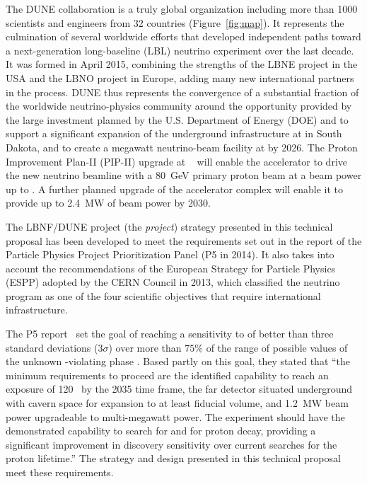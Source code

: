 The DUNE collaboration is a truly global organization including more than \num{1000} scientists and engineers from \num{32} countries (Figure~\ref{fig:map}). It represents the culmination of several worldwide efforts that developed independent paths toward a next-generation long-baseline (LBL) neutrino experiment over the last decade. It was formed in April 2015, combining the strengths of the LBNE project in the USA and the LBNO project in Europe, adding many new international partners in the process. DUNE thus represents the convergence of a substantial fraction of the worldwide neutrino-physics community around the opportunity provided by the large investment planned by the U.S. Department of Energy (DOE) and \fnal to support a significant expansion of the underground infrastructure at \surf in South Dakota, and to create a megawatt neutrino-beam facility at \fnal by 2026. The Proton Improvement Plan-II (PIP-II) upgrade at \fnal~\cite{pip2-2013} will enable the accelerator to drive the new neutrino beamline with a \SI{80}{\GeV} primary proton beam at a beam power %
up to \pipiibeampower{}. A further planned upgrade 
of the accelerator complex will enable it to provide up to \SI{2.4}{\MW} of beam power by 2030. 

The LBNF/DUNE project (the \textit{project}) strategy presented in this technical proposal has been developed to meet the requirements set out in the report of the Particle Physics Project Prioritization Panel (P5 in 2014). It also takes into account the recommendations of the European Strategy for Particle  Physics (ESPP) adopted by the CERN Council in 2013, which classified the  neutrino program as one of the four scientific objectives that require international infrastructure.

The P5 report~\cite{p5report} set the goal of reaching a sensitivity to  of better than three standard deviations (\num{3}$\sigma$) over more than $75\%$ 
of the range of possible values of the unknown -violating phase \deltacp.
Based partly on this goal, they stated that ``the 
minimum requirements to proceed are the identified capability to reach an exposure 
of \num{120}~\ktMWyr{} by the 2035 time frame, the far detector situated underground 
with cavern space for expansion to at least \fdfiducialmass \lar fiducial volume, and \SI{1.2}{MW} 
beam power upgradeable to multi-megawatt power.
The experiment should have the demonstrated 
capability to search for  and for proton decay, providing a significant 
improvement in discovery sensitivity over current searches for the proton lifetime.'' The strategy and design presented in this technical proposal meet these requirements.


